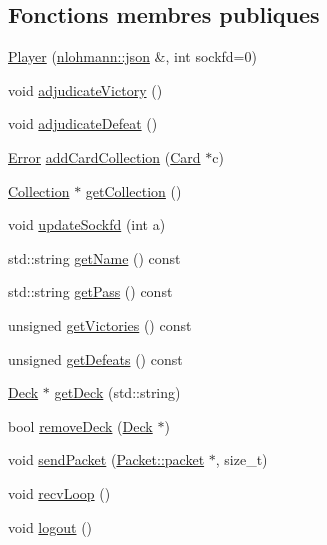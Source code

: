 \subsection*{Fonctions membres publiques}
\begin{DoxyCompactItemize}
\item 
\hyperlink{classPlayer_a9e88d178553a82a6c7406b8ff78e1beb}{Player} (\hyperlink{CardManager_8hpp_ab701e3ac61a85b337ec5c1abaad6742d}{nlohmann\+::json} \&, int sockfd=0)
\item 
void \hyperlink{classPlayer_a224828ffebbc85cda6a370eb7fab7332}{adjudicate\+Victory} ()
\item 
void \hyperlink{classPlayer_a882d9db35e3277bcd2db52fa9eca7dfb}{adjudicate\+Defeat} ()
\item 
\hyperlink{Error_8hpp_a2c3e4bb40f36b262a5214e2da2bca9c5}{Error} \hyperlink{classPlayer_ad6b7d88cbcd56aeb046c154fdedeb52e}{add\+Card\+Collection} (\hyperlink{classCard}{Card} $\ast$c)
\item 
\hyperlink{classCollection}{Collection} $\ast$ \hyperlink{classPlayer_ae38bd4a5ac62cc7ba9b23d026d15450c}{get\+Collection} ()
\item 
void \hyperlink{classPlayer_adf7cea3607c835e1c32f054524cd3027}{update\+Sockfd} (int a)
\item 
std\+::string \hyperlink{classPlayer_ad4c6a95f1cf69c44d0c585465b101c70}{get\+Name} () const 
\item 
std\+::string \hyperlink{classPlayer_a244625f85468369c2dd4115d10dd96c0}{get\+Pass} () const 
\item 
unsigned \hyperlink{classPlayer_a6cce4ff00f12069ee17a0c8d8be7912a}{get\+Victories} () const 
\item 
unsigned \hyperlink{classPlayer_ac8d227b243a10660a092e289365d4f13}{get\+Defeats} () const 
\item 
\hyperlink{classDeck}{Deck} $\ast$ \hyperlink{classPlayer_a6c898ad99ed40603cf7a9f00794f05b1}{get\+Deck} (std\+::string)
\item 
bool \hyperlink{classPlayer_af7f21437111ed192905e76777e1cfcff}{remove\+Deck} (\hyperlink{classDeck}{Deck} $\ast$)
\item 
void \hyperlink{classPlayer_a0c46832cd1be0b49a8fb5da6a6740b8c}{send\+Packet} (\hyperlink{structPacket_1_1packet}{Packet\+::packet} $\ast$, size\+\_\+t)
\item 
void \hyperlink{classPlayer_a6ccab23dfb76dd2c847b28ed4ff5110f}{recv\+Loop} ()
\item 
void \hyperlink{classPlayer_aae7b7b23ca32f9746f88a8f8f687e0e3}{logout} ()

\end{DoxyCompactItemize}
